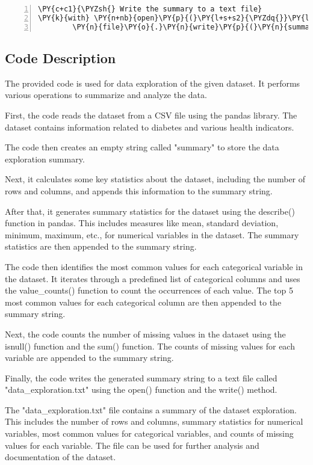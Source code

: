 \documentclass[11pt]{article}
\begin{document}
\begin{Verbatim}[commandchars=\\\{\},numbers=left,firstnumber=1,stepnumber=1,formatcom=\footnotesize]
\PY{c+c1}{\PYZsh{} Write the summary to a text file}
\PY{k}{with} \PY{n+nb}{open}\PY{p}{(}\PY{l+s+s2}{\PYZdq{}}\PY{l+s+s2}{data\PYZus{}exploration.txt}\PY{l+s+s2}{\PYZdq{}}\PY{p}{,} \PY{l+s+s2}{\PYZdq{}}\PY{l+s+s2}{w}\PY{l+s+s2}{\PYZdq{}}\PY{p}{)} \PY{k}{as} \PY{n}{file}\PY{p}{:}
        \PY{n}{file}\PY{o}{.}\PY{n}{write}\PY{p}{(}\PY{n}{summary}\PY{p}{)}
\end{Verbatim}
\subsection*{Code Description}

The provided code is used for data exploration of the given dataset. It performs various operations to summarize and analyze the data.

First, the code reads the dataset from a CSV file using the pandas library. The dataset contains information related to diabetes and various health indicators.

The code then creates an empty string called "summary" to store the data exploration summary.

Next, it calculates some key statistics about the dataset, including the number of rows and columns, and appends this information to the summary string.

After that, it generates summary statistics for the dataset using the describe() function in pandas. This includes measures like mean, standard deviation, minimum, maximum, etc., for numerical variables in the dataset. The summary statistics are then appended to the summary string.

The code then identifies the most common values for each categorical variable in the dataset. It iterates through a predefined list of categorical columns and uses the value\_counts() function to count the occurrences of each value. The top 5 most common values for each categorical column are then appended to the summary string.

Next, the code counts the number of missing values in the dataset using the isnull() function and the sum() function. The counts of missing values for each variable are appended to the summary string.

Finally, the code writes the generated summary string to a text file called "data\_exploration.txt" using the open() function and the write() method.

The "data\_exploration.txt" file contains a summary of the dataset exploration. This includes the number of rows and columns, summary statistics for numerical variables, most common values for categorical variables, and counts of missing values for each variable. The file can be used for further analysis and documentation of the dataset.
\end{document}
